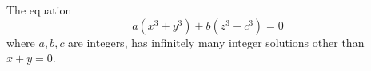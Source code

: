 \begin{proposition}
    The equation
\[
    a(x^3+y^3)+b(z^3+c^3)=0
\]
    where $a,b,c$ are integers, has infinitely many integer solutions other than $x+y=0$.
\end{proposition}
